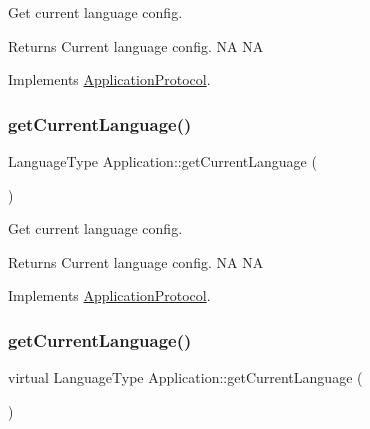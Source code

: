 Get current language config. 

\begin{DoxyReturn}{Returns}
Current language config.  NA  NA 
\end{DoxyReturn}


Implements \hyperlink{classApplicationProtocol_a44034ed02f9dd0fc59264f74f9ef9b17}{Application\+Protocol}.

\mbox{\label{classApplication_a53107377c9d2531f171ba6f619aae78f}} 
\subsubsection{\texorpdfstring{get\+Current\+Language()}{getCurrentLanguage()}\hspace{0.1cm}{\footnotesize\ttfamily [3/12]}}
{\footnotesize\ttfamily Language\+Type Application\+::get\+Current\+Language (\begin{DoxyParamCaption}{ }\end{DoxyParamCaption})\hspace{0.3cm}{\ttfamily [virtual]}}



Get current language config. 

\begin{DoxyReturn}{Returns}
Current language config.  NA  NA 
\end{DoxyReturn}


Implements \hyperlink{classApplicationProtocol_a44034ed02f9dd0fc59264f74f9ef9b17}{Application\+Protocol}.

\mbox{\label{classApplication_a3fd3aeff0465fffe782af5b1441131c6}} 
\subsubsection{\texorpdfstring{get\+Current\+Language()}{getCurrentLanguage()}\hspace{0.1cm}{\footnotesize\ttfamily [4/12]}}
{\footnotesize\ttfamily virtual Language\+Type Application\+::get\+Current\+Language (\begin{DoxyParamCaption}{ }\end{DoxyParamCaption})\hspace{0.3cm}{\ttfamily [virtual]}}



